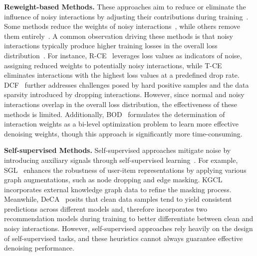 \textbf{Reweight-based Methods.} These approaches aim to reduce or eliminate the influence of noisy interactions by adjusting their contributions during training~\cite{wang2021denoising, he2024double, lin2023autodenoise, wang2023efficient}. Some methods reduce the weights of noisy interactions~\cite{wang2021denoising, gao2022selfguided, lin2023autodenoise, wang2023efficient}, while others remove them entirely~\cite{wang2021denoising, he2024double}. A common observation driving these methods is that noisy interactions typically produce higher training losses in the overall loss distribution~\cite{wang2021denoising, he2024double, gao2022selfguided, lin2023autodenoise}. For instance, R-CE~\cite{wang2021denoising} leverages loss values as indicators of noise, assigning reduced weights to potentially noisy interactions, while T-CE~\cite{wang2021denoising} eliminates interactions with the highest loss values at a predefined drop rate. DCF~\cite{he2024double} further addresses challenges posed by hard positive samples and the data sparsity introduced by dropping interactions. However, since normal and noisy interactions overlap in the overall loss distribution, the effectiveness of these methods is limited. Additionally, BOD~\cite{wang2023efficient} formulates the determination of interaction weights as a bi-level optimization problem to learn more effective denoising weights, though this approach is significantly more time-consuming.

\textbf{Self-supervised Methods.} Self-supervised approaches mitigate noise by introducing auxiliary signals through self-supervised learning~\cite{ma2024madm, wang2022learning, fan2023graph, quan2023robust, zhu2023knowledge}. For example, SGL~\cite{wu2021selfsupervised} enhances the robustness of user-item representations by applying various graph augmentations, such as node dropping and edge masking. KGCL~\cite{yang2022knowledge} incorporates external knowledge graph data to refine the masking process. Meanwhile, DeCA~\cite{wang2022learning} posits that clean data samples tend to yield consistent predictions across different models and, therefore incorporates two recommendation models during training to better differentiate between clean and noisy interactions. However, self-supervised approaches rely heavily on the design of self-supervised tasks, and these heuristics cannot always guarantee effective denoising performance.



